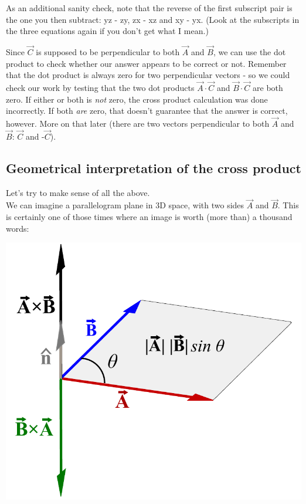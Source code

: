 \documentclass[12pt,a4paper]{report}
\begin{document}
As an additional sanity check, note that the reverse of the first subscript pair is the one you then subtract: yz - zy, zx - xz and xy - yx. (Look at the subscripts in the three equations again if you don't get what I mean.)

Since $\vec{C}$ is supposed to be perpendicular to both $\vec{A}$ and $\vec{B}$, we can use the dot product to check whether our answer appears to be correct or not. Remember that the dot product is always zero for two perpendicular vectors - so we could check our work by testing that the two dot products $\vec{A} \cdot \vec{C}$ and $\vec{B} \cdot \vec{C}$ are both zero. If either or both is \emph{not} zero, the cross product calculation was done incorrectly. If both \emph{are} zero, that doesn't guarantee that the answer is correct, however. More on that later (there are two vectors perpendicular to both $\vec{A}$ and $\vec{B}$: $\vec{C}$ and -$\vec{C}$).

\subsection{Geometrical interpretation of the cross product}
Let's try to make sense of all the above.\\
We can imagine a parallelogram plane in 3D space, with two sides $\vec{A}$ and $\vec{B}$. This is certainly one of those times where an image is worth (more than) a thousand words:

\includegraphics[scale=0.5]{Graphics/vectors/cross-product-with-area}
\end{document}
